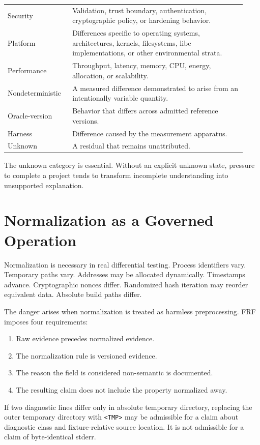 \documentclass[11pt,a4paper]{article}
\newcommand{\frf}{\textsc{FRF}}
\begin{document}
\begin{longtable}{p{0.25\linewidth}p{0.68\linewidth}}
Security & Validation, trust boundary, authentication, cryptographic policy, or hardening behavior. \\
Platform & Differences specific to operating systems, architectures, kernels, filesystems, libc implementations, or other environmental strata. \\
Performance & Throughput, latency, memory, CPU, energy, allocation, or scalability. \\
Nondeterministic & A measured difference demonstrated to arise from an intentionally variable quantity. \\
Oracle-version & Behavior that differs across admitted reference versions. \\
Harness & Difference caused by the measurement apparatus. \\
Unknown & A residual that remains unattributed. \\
\bottomrule
\end{longtable}

The unknown category is essential. Without an explicit unknown state, pressure to complete a project tends to transform incomplete understanding into unsupported explanation.

\section{Normalization as a Governed Operation}

Normalization is necessary in real differential testing. Process identifiers vary. Temporary paths vary. Addresses may be allocated dynamically. Timestamps advance. Cryptographic nonces differ. Randomized hash iteration may reorder equivalent data. Absolute build paths differ.

The danger arises when normalization is treated as harmless preprocessing. \frf{} imposes four requirements:
\begin{enumerate}
\item Raw evidence precedes normalized evidence.
\item The normalization rule is versioned evidence.
\item The reason the field is considered non-semantic is documented.
\item The resulting claim does not include the property normalized away.
\end{enumerate}

If two diagnostic lines differ only in absolute temporary directory, replacing the outer temporary directory with \texttt{<TMP>} may be admissible for a claim about diagnostic class and fixture-relative source location. It is not admissible for a claim of byte-identical stderr.
\end{document}

